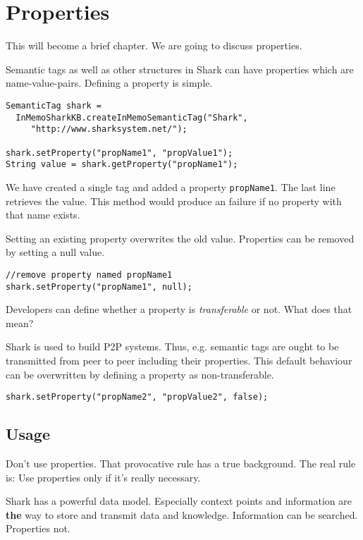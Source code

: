 \chapter{Properties}
This will become a brief chapter. We are going to discuss properties. 

Semantic tags as well as other structures in Shark can have properties which are name-value-pairs. Defining a property is simple.

\begin{verbatim}
SemanticTag shark = 
  InMemoSharkKB.createInMemoSemanticTag("Shark", 
     "http://www.sharksystem.net/");

shark.setProperty("propName1", "propValue1");
String value = shark.getProperty("propName1");

\end{verbatim}

We have created a single tag and added a property {\tt propName1}. The last line retrieves the value. This method would produce an failure if no property with that name exists.

Setting an existing property overwrites the old value. Properties can be removed by setting a null value.

\begin{verbatim}
//remove property named propName1
shark.setProperty("propName1", null);
\end{verbatim}

Developers can define whether a property is {\it transferable} or not. What does that mean?

Shark is used to build P2P systems. Thus, e.g. semantic tags are ought to be transmitted from peer to peer including their properties. This default behaviour
can be overwritten by defining a property as non-transferable.

\begin{verbatim}
shark.setProperty("propName2", "propValue2", false);
\end{verbatim}

\section{Usage}
Don't use properties. That provocative rule has a true background. The real rule is: Use properties only if it's really necessary.

Shark has a powerful data model. Especially context points and information are {\bf the} way to store and transmit data and knowledge. Information can be searched. Properties not.

